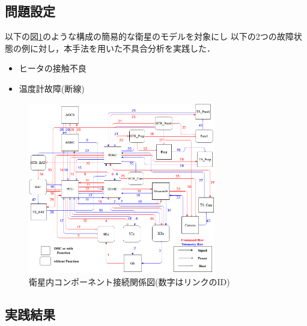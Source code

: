 \documentclass[11pt]{jsarticle}%
\begin{document}
\begin{multicols}{2}
  \subsection{問題設定}
  \vspace{-1zh}
  以下の図\ref{fig:satellite}のような構成の簡易的な衛星のモデルを対象にし
  以下の2つの故障状態の例に対し，本手法を用いた不具合分析を実践した．
  \begin{itemize}
   \item ヒータの接触不良
   \item 温度計故障(断線)
 \end{itemize}
  \begin{figure}[H]
    \centering
      \includegraphics[height=7.5cm]{../figure/satellite_diagram.png}
      \caption{衛星内コンポーネント接続関係図(数字はリンクのID)}
      \label{fig:satellite}
  \end{figure}
\vspace{-1zh}
\subsection{実践結果}
  \vspace{-1zh}

\end{multicols}
\end{document}
